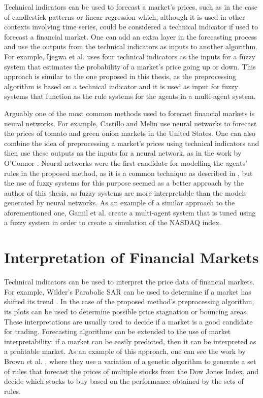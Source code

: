 Technical indicators can be used to forecast a market's prices, such as in the
case of candlestick patterns \cite{Nison1991} or linear regression
\cite{kutner2004applied} which, although it is used in other contexts involving
time series, could be considered a technical indicator if used to forecast a
financial market. One can add an extra layer in the forecasting process and use
the outputs from the technical indicators as inputs to another algorithm. For
example, Ijegwa et al. \cite{Ijegwa2014} uses four technical indicators as the
inputs for a fuzzy system that estimates the probability of a market's price
going up or down. This approach is similar to the one proposed in this thesis,
as the preprocessing algorithm is based on a technical indicator and it is used
as input for fuzzy systems that function as the rule systems for the agents in a
multi-agent system.

Arguably one of the most common methods used to forecast financial markets is
neural networks. For example, Castillo and Melin \cite{Castillo2001}
\cite{melin2007hybrid} use neural networks to forecast the prices of tomato and
green onion markets in the United States. One can also combine the idea of
preprocessing a market's prices using technical indicators and then use these
outputs as the inputs for a neural network, as in the work by O'Connor
\cite{Connor2005}. Neural networks were the first candidate for modelling the
agents' rules in the proposed method, as it is a common technique as described
in \cite{Grothmann2002}, but the use of fuzzy systems for this purpose seemed as
a better approach by the author of this thesis, as fuzzy systems are more
interpretable than the models generated by neural networks. As an example of a
similar approach to the aforementioned one, Gamil et al. \cite{Gamil2007} create
a multi-agent system that is tuned using a fuzzy system in order to create a
simulation of the NASDAQ index.

\section{Interpretation of Financial Markets}
\label{section:interpretation-of-financial-markets}

Technical indicators can be used to interpret the price data of financial
markets. For example, Wilder's Parabolic SAR can be used to determine if a
market has shifted its trend \cite{Wilder1978}. In the case of the proposed
method's preprocessing algorithm, its plots can be used to determine possible
price stagnation or bouncing areas. These interpretations are usually used to
decide if a market is a good candidate for trading. Forecasting algorithms can
be extended to the use of market interpretability: if a market can be easily
predicted, then it can be interpreted as a profitable market. As an example of
this approach, one can see the work by Brown et al. \cite{Brown2013}, where they
use a variation of a genetic algorithm to generate a set of rules that forecast
the prices of multiple stocks from the Dow Jones Index, and decide which stocks
to buy based on the performance obtained by the sets of rules.


